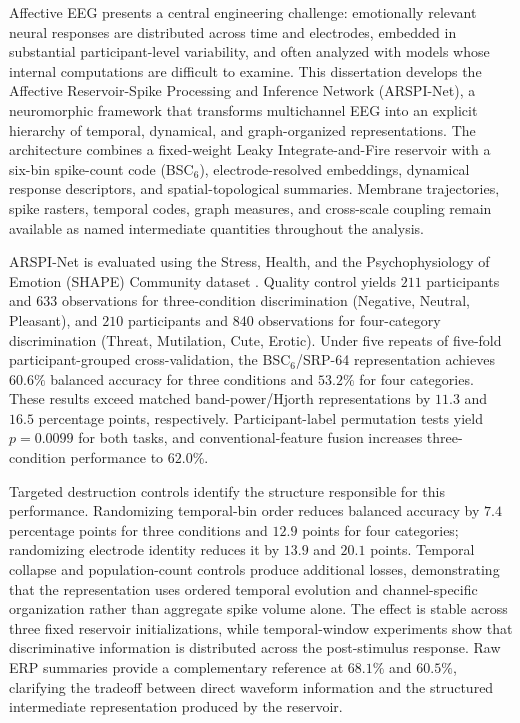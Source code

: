 \documentclass[12pt]{report}
\theoremstyle{definition}
\theoremstyle{remark}
\begin{document}
\noindent
Affective EEG presents a central engineering challenge: emotionally relevant neural responses are distributed across time and electrodes, embedded in substantial participant-level variability, and often analyzed with models whose internal computations are difficult to examine. This dissertation develops the Affective Reservoir-Spike Processing and Inference Network (ARSPI-Net), a neuromorphic framework that transforms multichannel EEG into an explicit hierarchy of temporal, dynamical, and graph-organized representations. The architecture combines a fixed-weight Leaky Integrate-and-Fire reservoir with a six-bin spike-count code (BSC$_6$), electrode-resolved embeddings, dynamical response descriptors, and spatial-topological summaries. Membrane trajectories, spike rasters, temporal codes, graph measures, and cross-scale coupling remain available as named intermediate quantities throughout the analysis.

ARSPI-Net is evaluated using the Stress, Health, and the Psychophysiology of Emotion (SHAPE) Community dataset \cite{noauthor_shape_2018}. Quality control yields $211$ participants and $633$ observations for three-condition discrimination (Negative, Neutral, Pleasant), and $210$ participants and $840$ observations for four-category discrimination (Threat, Mutilation, Cute, Erotic). Under five repeats of five-fold participant-grouped cross-validation, the BSC$_6$/SRP-64 representation achieves $60.6\%$ balanced accuracy for three conditions and $53.2\%$ for four categories. These results exceed matched band-power/Hjorth representations by $11.3$ and $16.5$ percentage points, respectively. Participant-label permutation tests yield $p=0.0099$ for both tasks, and conventional-feature fusion increases three-condition performance to $62.0\%$.

Targeted destruction controls identify the structure responsible for this performance. Randomizing temporal-bin order reduces balanced accuracy by $7.4$ percentage points for three conditions and $12.9$ points for four categories; randomizing electrode identity reduces it by $13.9$ and $20.1$ points. Temporal collapse and population-count controls produce additional losses, demonstrating that the representation uses ordered temporal evolution and channel-specific organization rather than aggregate spike volume alone. The effect is stable across three fixed reservoir initializations, while temporal-window experiments show that discriminative information is distributed across the post-stimulus response. Raw ERP summaries provide a complementary reference at $68.1\%$ and $60.5\%$, clarifying the tradeoff between direct waveform information and the structured intermediate representation produced by the reservoir.
\end{document}

